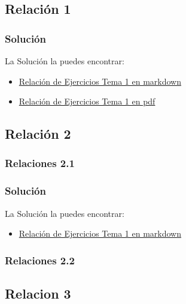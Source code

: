 \documentclass[a4paper,12pt]{article}
\begin{document}
\subsection{Relación 1}

\subsubsection{Solución}
La Solución la puedes encontrar:
\begin{itemize}
    \item \href{https://github.com/ElblogdeIsmael/ElblogdeIsmael.github.io/tree/main/Asignaturas/Tercer%20A%C3%B1o/SCD/Teoria/Tema1/RelacionEjerciciosTema1.md}{Relación de Ejercicios Tema 1 en markdown}
    \item \href{https://github.com/ElblogdeIsmael/ElblogdeIsmael.github.io/tree/main/Asignaturas/Tercer%20A%C3%B1o/SCD/Teoria/Tema1/RelacionEjerciciosTema1.pdf}{Relación de Ejercicios Tema 1 en pdf}
\end{itemize}

\subsection{Relación 2}
\subsubsection{Relaciones 2.1}

\subsubsection{Solución}
La Solución la puedes encontrar:
\begin{itemize}
    \item \href{https://github.com/ElblogdeIsmael/ElblogdeIsmael.github.io/tree/main/Asignaturas/Tercer%20A%C3%B1o/SCD/Teoria/Tema2/RelacionEjerciciosTema2.md}{Relación de Ejercicios Tema 1 en markdown}
\end{itemize}

\subsubsection{Relaciones 2.2}


\subsection{Relacion 3}

\end{document}
